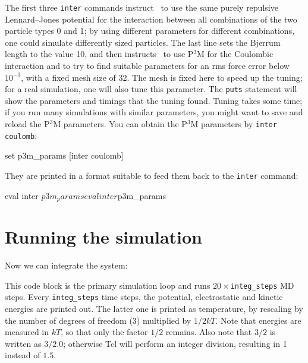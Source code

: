 \documentclass[
a4paper,                        %
11pt,                           %
twoside,                        %
footsepline,                    %
headsepline,                    %
headexclude,                    %
footexclude,                    %
pagesize,                       %
]{scrartcl}
\begin{document}
The first three \verb|inter| commands instruct \es\ to use the same
purely repulsive Lennard--Jones potential for the interaction between
all combinations of the two particle types 0 and 1; by using different
parameters for different combinations, one could simulate differently
sized particles.  The last line sets the Bjerrum length to the value
10, and then instructs \es\ to use P$^3$M for the Coulombic
interaction and to try to find suitable parameters for an rms force
error below $10^{-3}$, with a fixed mesh size of 32. The mesh is fixed
here to speed up the tuning; for a real simulation, one will also tune
this parameter. The \verb|puts| statement will show the parameters and
timings that the tuning found. Tuning takes some time; if you run many
simulations with similar parameters, you might want to save and reload
the P$^3$M parameters. You can obtain the P$^3$M parameters by
\verb|inter coulomb|:

\begin{tclcode}
  set p3m_params [inter coulomb]
\end{tclcode}

They are printed in a format suitable to feed them back to the
\verb|inter| command:

\begin{tclcode}
  eval inter $p3m_params
  eval inter $p3m_params
\end{tclcode}

\section{Running the simulation}

Now we can integrate the system:


This code block is the primary simulation loop and runs
$20\times$\verb|integ_steps| MD steps. Every \verb|integ_steps| time
steps, the potential, electrostatic and kinetic energies are printed
out. The latter one is printed as temperature, by rescaling by the
number of degrees of freedom (3) multiplied by $1/2kT$. Note that
energies are measured in $kT$, so that only the factor $1/2$
remains. Also note that $3/2$ is written as $3/2.0$; otherwise Tcl
will perform an integer division, resulting in 1 instead of $1.5$.
\end{document}
